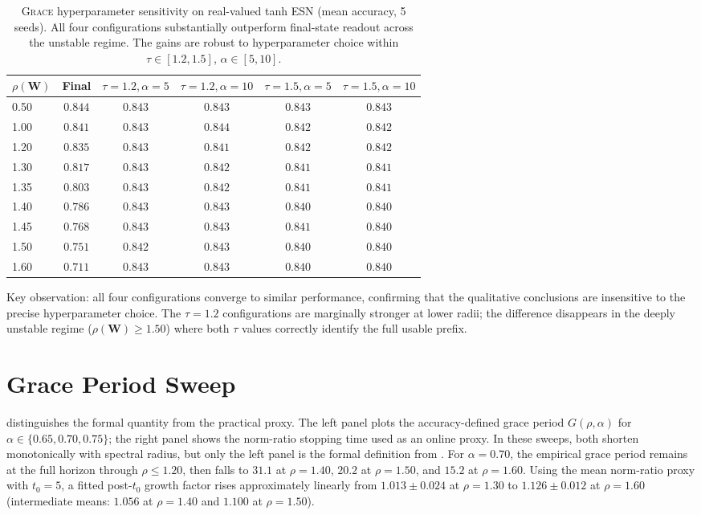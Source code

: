 \documentclass{article}
\theoremstyle{remark}
\newcommand{\bW}{\mathbf{W}}
\newcommand{\grace}{\textnormal{\textsc{Grace}}}
\newcommand{\sr}{\rho(\bW)}
\begin{document}
\begin{table}[H]
\centering
\caption{\grace{} hyperparameter sensitivity on real-valued tanh ESN
(mean accuracy, 5 seeds). All four configurations substantially outperform
final-state readout across the unstable regime. The gains are robust to
hyperparameter choice within $\tau \in [1.2, 1.5]$, $\alpha \in [5,10]$.}
\label{tab:esn_grace}
\small
\begin{tabular}{l c cccc}
\toprule
$\sr$ & Final & $\tau{=}1.2,\alpha{=}5$ & $\tau{=}1.2,\alpha{=}10$ & $\tau{=}1.5,\alpha{=}5$ & $\tau{=}1.5,\alpha{=}10$ \\
\midrule
0.50 & $0.844$ & $0.843$ & $0.843$ & $0.843$ & $0.843$ \\
1.00 & $0.841$ & $0.843$ & $0.844$ & $0.842$ & $0.842$ \\
1.20 & $0.835$ & $0.843$ & $0.841$ & $0.842$ & $0.842$ \\
1.30 & $0.817$ & $0.843$ & $0.842$ & $0.841$ & $0.841$ \\
1.35 & $0.803$ & $0.843$ & $0.842$ & $0.841$ & $0.841$ \\
1.40 & $0.786$ & $0.843$ & $0.843$ & $0.840$ & $0.840$ \\
1.45 & $0.768$ & $0.843$ & $0.843$ & $0.841$ & $0.840$ \\
1.50 & $0.751$ & $0.842$ & $0.843$ & $0.840$ & $0.840$ \\
1.60 & $0.711$ & $0.843$ & $0.843$ & $0.840$ & $0.840$ \\
\bottomrule
\end{tabular}
\end{table}
\noindent
Key observation: all four configurations converge to similar performance,
confirming that the qualitative conclusions are insensitive to the precise
hyperparameter choice. The $\tau=1.2$ configurations are marginally stronger
at lower radii; the difference disappears in the deeply unstable regime
($\sr \geq 1.50$) where both $\tau$ values correctly identify the full
usable prefix.


\section{Grace Period Sweep}
\label{app:grace_period}

 distinguishes the formal quantity from the practical
proxy. The left panel plots the accuracy-defined grace period
$G(\rho,\alpha)$ for $\alpha \in \{0.65, 0.70, 0.75\}$; the right panel shows
the norm-ratio stopping time used as an online proxy. In these sweeps, both
shorten monotonically with spectral radius, but only the left panel is the
formal definition from . For $\alpha=0.70$, the
empirical grace period remains at the full horizon through $\rho \leq 1.20$,
then falls to $31.1$ at $\rho=1.40$, $20.2$ at $\rho=1.50$, and $15.2$ at
$\rho=1.60$. Using the mean norm-ratio proxy with $t_0=5$, a fitted
post-$t_0$ growth factor rises approximately linearly from
$1.013\pm0.024$ at $\rho=1.30$ to $1.126\pm0.012$ at $\rho=1.60$
(intermediate means: $1.056$ at $\rho=1.40$ and $1.100$ at $\rho=1.50$).
\end{document}
